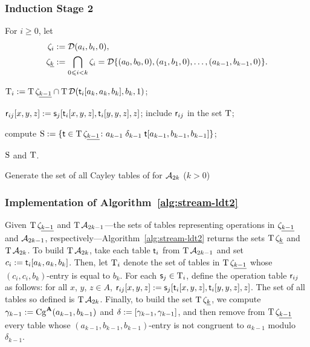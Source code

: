 \subsubsection{Induction Stage 2}
For $i\geq 0$, let
\begin{align*}
\zeta_i &:= \mathcal{D} (a_i, b_i, 0), \\
  \zeta_{\underline{k}} &:= \bigcap_{0\leqslant i < k}\zeta_i
  =\mathcal{D} \{(a_0, b_0, 0), (a_1, b_1, 0), \dots, (a_{k-1}, b_{k-1}, 0)\}.
\end{align*}

\begin{algorithm}

   {

    $\operatorname{T}_i := \operatorname{T} \zeta_{\underline{k-1}}  \cap \operatorname{T} \mathcal{D} (\mathsf{t}_i[a_k, a_k, b_k], b_k, 1)$;

     {
        {
        $\mathsf{r}_{ij}[x,y,z] :=  \mathsf{s}_{j}[\mathsf{t}_i[x,y,z], \mathsf{t}_i[y,y,z], z]$;
      }
      include $\mathsf{r}_{ij}$ in the set $\operatorname{T}$;
    }
  }

  compute $\operatorname{S} := \{\mathsf{t} \in \operatorname{T} \zeta_{\underline{k-1}} \colon a_{k-1} \mathrel{\delta_{k-1}} \mathsf{t}[a_{k-1},b_{k-1},b_{k-1}]\}$;

  \Return $\operatorname{S}$ and $\operatorname{T}$.

  \caption{Generate the set of all Cayley tables of \ldtos for $\mathcal{A}_{2k}$ \label{alg:stream-ldt2} {\small ($k> 0$)}}
\end{algorithm}




\subsubsection{Implementation of Algorithm~\ref{alg:stream-ldt2}}
Given $\operatorname{T} \zeta_{\underline{k-1}}$
and $\operatorname{T} \mathcal{A}_{2k-1}$---the sets of tables representing operations in
$\zeta_{\underline{k-1}}$ and $\mathcal{A}_{2k-1}$, respectively---Algorithm~\ref{alg:stream-ldt2}
returns the sets $\operatorname{T} \zeta_{\underline{k}}$ and $\operatorname{T} \mathcal{A}_{2k}$.
To build $\operatorname{T} \mathcal{A}_{2k}$, take each table $\mathsf{t}_i$ from $\operatorname{T} \mathcal{A}_{2k-1}$
and set $c_i:= \mathsf{t}_i[a_k, a_k, b_k]$. Then, let $\operatorname{T}_i$ denote
the set of tables in $\operatorname{T} \zeta_{\underline{k-1}}$ whose
$(c_i, c_i, b_k)$-entry is equal to $b_k$.
For each $\mathsf{s}_j \in \operatorname{T}_i$, define the operation table
$\mathsf{r}_{ij}$ as follows:
for all $x$, $y$, $z \in A$,
$\mathsf{r}_{ij}[x,y,z] :=  \mathsf{s}_{j}[\mathsf{t}_i[x,y,z], \mathsf{t}_i[y,y,z], z]$.
The set of all tables so defined is $\operatorname{T} \mathcal{A}_{2k}$.
Finally, to build the set $\operatorname{T} \zeta_{\underline{k}}$, we
compute $\gamma_{k-1} := \operatorname{Cg}^{\mathbf{A}}(a_{k-1}, b_{k-1})$ and $\delta := [\gamma_{k-1}, \gamma_{k-1}]$,
and then remove from $\operatorname{T} \zeta_{\underline{k-1}}$ every table whose
$(a_{k-1},b_{k-1},b_{k-1})$-entry is not congruent to $a_{k-1}$ modulo $\delta_{k-1}$.







